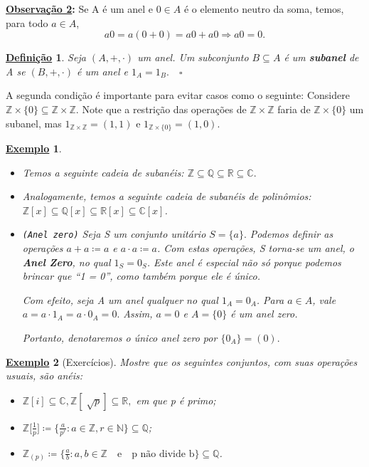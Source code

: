 \documentclass{article}
\newtheorem*{def*}{\underline{Defini\c c\~ao}}
\newtheorem{example}{\underline{Exemplo}}
\begin{document}
\textbf{\underline{Observação 2}:} Se A é um anel e \(0\in A\) é o elemento neutro da soma, temos, para todo \(a\in A\), 
\[
  a0 = a(0+0) = a0 + a0 \Rightarrow a0 = 0.
\]
\begin{def*}
  Seja \((A, +, \cdot )\) um anel. Um subconjunto \(B\subseteq{A}\) é um \textbf{subanel} de A se \((B, +, \cdot )\) é um anel e \(1_{A} = 1_{B}.\quad\square\)
\end{def*}
A segunda condição é importante para evitar casos como o seguinte: Considere \(\mathbb{Z}\times \{0\}\subseteq{\mathbb{Z}\times \mathbb{Z}}.\) Note que a restrição
das operações de \(\mathbb{Z}\times \mathbb{Z}\) faria de \(\mathbb{Z}\times \{0\}\) um subanel, mas \(1_{\mathbb{Z}\times \mathbb{Z}} = (1, 1)\) e \(1_{\mathbb{Z}\times\{0\}}=(1, 0).\)
\begin{example}
  \begin{itemize}
    \item[i)] Temos a seguinte cadeia de subanéis: \(\mathbb{Z}\subseteq{\mathbb{Q}}\subseteq{\mathbb{R}}\subseteq{\mathbb{C}}.\)
    \item[ii)] Analogamente, temos a seguinte cadeia de subanéis de polinômios: \(\mathbb{Z}[x]\subseteq{\mathbb{Q}[x]}\subseteq{\mathbb{R}[x]}\subseteq{\mathbb{C}[x]}\).
    \item[iii)]\texttt{(Anel zero)} Seja S um conjunto unitário \(S = \{a\}.\) Podemos definir as operações \(a + a\coloneqq a\) e \(a \cdot a\coloneqq a\). Com estas operações,
      S torna-se um anel, o \textbf{Anel Zero}, no qual \(1_{S} = 0_{S}\). Este anel é especial não só porque podemos brincar que ``1 = 0'', como também porque ele é \textit{único}.

      Com efeito, seja A um anel qualquer no qual \(1_{A} = 0_{A}\). Para \(a\in A\), vale \(a = a \cdot 1_{A} = a \cdot 0_{A} = 0.\) Assim, \(a = 0\) e \(A = \{0\}\) é 
      um anel zero. 

      Portanto, denotaremos o único anel zero por \(\{0_{A}\} = (0).\)
  \end{itemize}
\end{example}
\begin{example}[Exercícios]
  Mostre que os seguintes conjuntos, com suas operações usuais, são anéis:
  \begin{itemize}
    \item[a)] \(\mathbb{Z}[i] \subseteq{\mathbb{C}}, \mathbb{Z}[\sqrt[]{p}]\subseteq{\mathbb{R}},\) em que p é primo;
    \item[b)] \(\mathbb{Z}\biggl[\frac{1}{p}\biggr]\coloneqq \biggl\{\frac{a}{p^{r}}: a\in \mathbb{Z}, r\in \mathbb{N}\biggr\}\subseteq{\mathbb{Q}}\);
    \item[c)] \(\mathbb{Z}_{(p)}\coloneqq \biggl\{\frac{a}{b}: a, b\in \mathbb{Z}\quad \text{e}\quad \text{p não divide b} \biggr\}\subseteq{\mathbb{Q}}\).
  \end{itemize}
\end{example}
\end{document}
